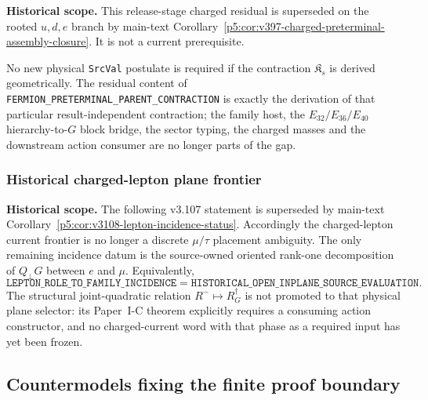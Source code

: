 \documentclass[11pt,a4paper]{article}
\begin{document}
\begin{corollary}
\label{p5:cor:v396-charged-residual-retyped}
\noindent\textbf{Historical scope.} This release-stage charged residual is superseded on the rooted $u,d,e$ branch by main-text Corollary~\ref{p5:cor:v397-charged-preterminal-assembly-closure}. It is not a current prerequisite.

No new physical \texttt{SrcVal} postulate is required if the contraction
$\mathfrak K_s$ is derived geometrically.  The residual content of
\texttt{FERMION\_PRETERMINAL\_PARENT\_CONTRACTION} is exactly the derivation
of that particular result-independent contraction; the family host, the
$E_{32}/E_{36}/E_{40}$ hierarchy-to-$G$ block bridge, the sector typing, the
charged masses and the downstream action consumer are no longer parts of the
gap.
\end{corollary}

\subsubsection{Historical charged-lepton plane frontier}
\noindent\textbf{Historical scope.} The following v3.107 statement is superseded by main-text Corollary~\ref{p5:cor:v3108-lepton-incidence-status}.
Accordingly the charged-lepton current frontier is no longer a discrete
$\mu/\tau$ placement ambiguity.  The only remaining incidence datum is the
source-owned oriented rank-one decomposition of $Q_\perp G$ between $e$ and
$\mu$.  Equivalently,
\[
 \boxed{
 \texttt{LEPTON\_ROLE\_TO\_FAMILY\_INCIDENCE}
 =\texttt{HISTORICAL\_OPEN\_INPLANE\_SOURCE\_EVALUATION}.}
\]
The structural joint-quadratic relation $R^-\mapsto R_G^\dagger$ is not
promoted to that physical plane selector: its Paper~I-C theorem explicitly
requires a consuming action constructor, and no charged-current word with that
phase as a required input has yet been frozen.





\subsection{Countermodels fixing the finite proof boundary}
\label{p5:app:selector-countermodels}
\end{document}
